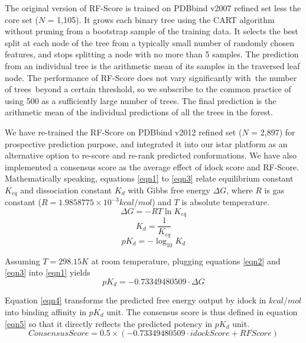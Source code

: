 \documentclass[10pt]{article}
\begin{document}
The original version of RF-Score \cite{564} is trained on PDBbind v2007 refined set less the core set ($N$ = 1,105). It grows each binary tree using the CART algorithm \cite{1310} without pruning from a bootstrap sample of the training data. It selects the best split at each node of the tree from a typically small number of randomly chosen features, and stops splitting a node with no more than 5 samples. The prediction from an individual tree is the arithmetic mean of its samples in the traversed leaf node. The performance of RF-Score does not vary significantly with the number of trees beyond a certain threshold, so we subscribe to the common practice of using 500 as a sufficiently large number of trees. The final prediction is the arithmetic mean of the individual predictions of all the trees in the forest.

We have re-trained the RF-Score on PDBbind v2012 refined set ($N$ = 2,897) for prospective prediction purpose, and integrated it into our istar platform as an alternative option to re-score and re-rank predicted conformations. We have also implemented a consensus score as the average effect of idock score and RF-Score. Mathematically speaking, equations \eqref{eqn1} to \eqref{eqn3} relate equilibrium constant $K_{eq}$ and dissociation constant $K_d$ with Gibbs free energy $\Delta G$, where $R$ is gas constant ($R = 1.9858775 \times 10^{-3} kcal/mol$) and $T$ is absolute temperature.
\begin{equation}
\label{eqn1}
\Delta G = -RT\ln K_{eq}
\end{equation}
\begin{equation}
\label{eqn2}
K_d = \frac{1}{K_{eq}}
\end{equation}
\begin{equation}
\label{eqn3}
pK_d = -\log_{10} K_d
\end{equation}

Assuming $T = 298.15K$ at room temperature, plugging equations \eqref{eqn2} and \eqref{eqn3} into \eqref{eqn1} yields
\begin{equation}
\label{eqn4}
pK_d = -0.73349480509 \cdot \Delta G
\end{equation}

Equation \eqref{eqn4} transforms the predicted free energy output by idock in $kcal/mol$ into binding affinity in $pK_d$ unit. The consensus score is thus defined in equation \eqref{eqn5} so that it directly reflects the predicted potency in $pK_d$ unit.
\begin{equation}
\label{eqn5}
ConsensusScore = 0.5 \times (-0.73349480509 \cdot idockScore + RFScore)
\end{equation}
\end{document}
